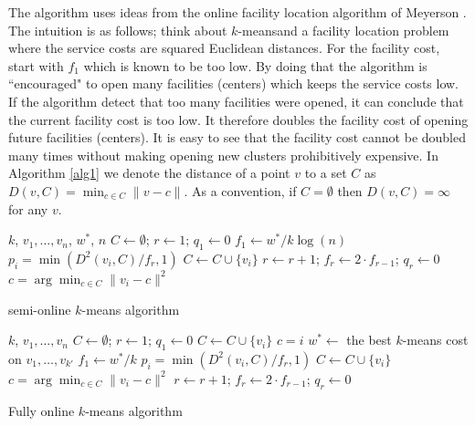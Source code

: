 \documentclass[11pt,twoside]{article}
\newcommand{\kmeans}{$k$-means}
\def\tab{\hspace{5mm}}
\begin{document}
The algorithm uses ideas from the online facility location algorithm of Meyerson \cite{Meyerson01}.
The intuition is as follows; think about \kmeans and a facility location problem where the service costs are squared Euclidean distances.
For the facility cost, start with $f_1$ which is known to be too low. 
By doing that the algorithm is ``encouraged" to open many facilities (centers) which keeps the service costs low.
If the algorithm detect that too many facilities were opened, it can conclude that the current facility cost is too low. 
It therefore doubles the facility cost of opening future facilities (centers).
It is easy to see that the facility cost cannot be doubled many times without making opening new clusters prohibitively expensive.
In Algorithm \ref{alg1} we denote the distance of a point $v$ to a set $C$ as $D(v, C) = \min_{c \in C}\|v - c\|$.
As a convention, if $C = \emptyset$ then $D(v, C) = \infty$ for any $v$.

\begin{algorithm}
\begin{algorithmic}
 $k$, $v_1,\ldots,v_n$, $w^*$, $n$
\STATE $C \gets \emptyset$;\;\; $r \gets 1$;\;\; $q_1 \gets 0$ 
\STATE $f_1 \gets w^*/k\log(n)$
	 $p_i = \min(D^2(v_i, C)/f_r,1)$
	\STATE \tab $C \gets C \cup \{v_i\}$
		\STATE $r \gets r+1$;\;\;  $f_r \gets 2\cdot f_{r-1}$;\;\; $q_r \gets 0$
	\ENDIF
	 $c = \arg\min_{c \in C}\|v_i - c\|^2$
\ENDFOR
\caption{semi-online $k$-means algorithm}\label{alg3}
\end{algorithmic}
\end{algorithm}

\begin{algorithm}
\begin{algorithmic}
 $k$, $v_1,\ldots,v_n$
\STATE $C \gets \emptyset$;\;\; $r \gets 1$;\;\; $q_1 \gets 0$ 
	\STATE $C \gets C \cup \{v_i\}$
	 $c = i$
\ENDFOR
\STATE $w^{*} \gets$ the best $k$-means cost on $v_1,\ldots,v_{k'}$
\STATE $f_1 \gets  w^{*}/k$
	 $p_i = \min(D^2(v_i, C)/f_r,1)$
	\STATE \tab $C \gets C \cup \{v_i\}$
	 $c = \arg\min_{c \in C}\|v_i - c\|^2$
		\STATE $r \gets r+1$;\;\;  $f_r \gets 2\cdot f_{r-1}$;\;\; $q_r \gets 0$
	\ENDIF
\ENDFOR
\caption{Fully online $k$-means algorithm}\label{alg1}
\end{algorithmic}
\end{algorithm}
\end{document}
